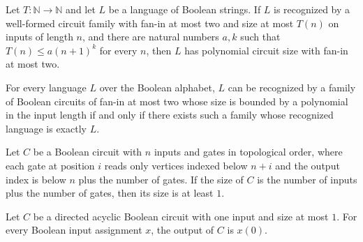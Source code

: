 \begin{theorem}
\label{Language.InSIZE.inPPoly}
\leanok
{}
Let $T : \mathbb{N} \to \mathbb{N}$ and let $L$ be a language of Boolean strings. If $L$
is recognized by a well-formed circuit family with fan-in at most two and size at most
$T(n)$ on inputs of length $n$, and there are natural numbers $a,k$ such that $T(n) \le
a(n+1)^k$ for every $n$, then $L$ has polynomial circuit size with fan-in at most two.
\end{theorem}

\begin{theorem}
\label{Language.inPPoly_iff}
\leanok
{}
For every language $L$ over the Boolean alphabet, $L$ can be recognized by a family of
Boolean circuits of fan-in at most two whose size is bounded by a polynomial in the
input length if and only if there exists such a family whose recognized language is
exactly $L$.
\end{theorem}

\begin{theorem}
\label{BoolCircuit.DAGCircuit.one_le_size}
\leanok
{}
Let $C$ be a Boolean circuit with $n$ inputs and gates in topological order, where each
gate at position $i$ reads only vertices indexed below $n+i$ and the output index is
below $n$ plus the number of gates. If the size of $C$ is the number of inputs plus the
number of gates, then its size is at least $1$.
\end{theorem}

\begin{theorem}
\label{BoolCircuit.DAGCircuit.eval_of_size_le_one}
\leanok
{}
Let $C$ be a directed acyclic Boolean circuit with one input and size at most $1$. For
every Boolean input assignment $x$, the output of $C$ is $x(0)$.
\end{theorem}

